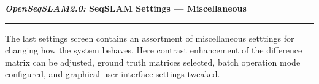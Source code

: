 \centerline{\textbf{\textit{OpenSeqSLAM2.0:} SeqSLAM Settings --- Miscellaneous}}
\noindent\rule{\textwidth}{2pt}
\bigskip
\parbox{\textwidth}{The last settings screen contains an assortment of miscellaneous setttings for changing how the system behaves. Here contrast enhancement of the difference matrix can be adjusted, ground truth matrices selected, batch operation mode configured, and graphical user interface settings tweaked.}
\bigskip
